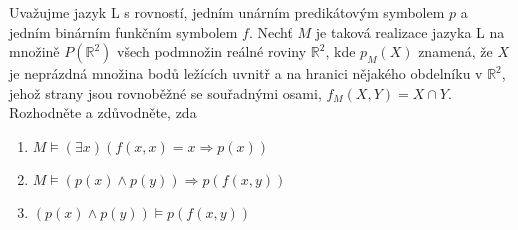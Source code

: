 Uvažujme jazyk L s rovností, jedním unárním predikátovým symbolem $p$ a jedním
binárním funkčním symbolem $f$. Nechť $M$ je taková realizace jazyka L na
množině $P(\mathbb{R}^{2})$ všech podmnožin reálné roviny $\mathbb{R}^{2}$, kde
$p_{M}(X)$ znamená, že $X$ je neprázdná množina bodů ležících uvnitř a na
hranici nějakého obdelníku v $\mathbb{R}^{2}$, jehož strany jsou rovnoběžné se
souřadnými osami, $f_{M}(X,Y) = X \cap Y$. Rozhodněte a zdůvodněte, zda
\begin{enumerate}[(1)]
  \item $M \models (\exists x)(f(x,x)=x \Rightarrow p(x))$
  \item $M \models (p(x) \wedge p(y)) \Rightarrow p(f(x,y))$
  \item $(p(x) \wedge p(y)) \models p(f(x,y))$
\end{enumerate}

